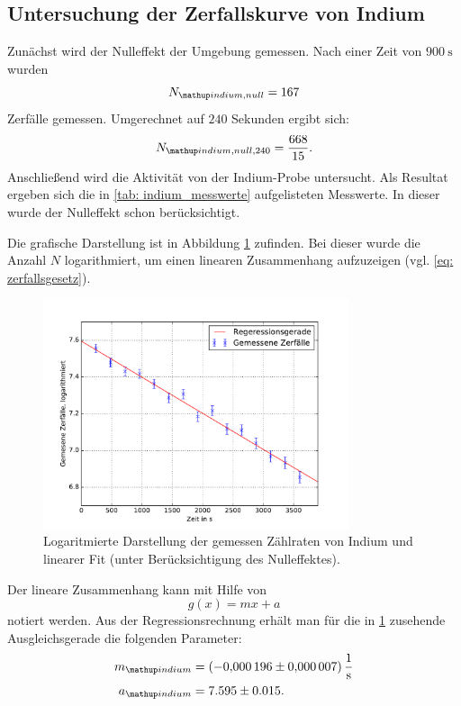 \subsection{Untersuchung der Zerfallskurve von Indium}
Zunächst wird der Nulleffekt der Umgebung gemessen.
Nach einer Zeit von $\SI{900}{\second}$ wurden
\begin{equation*}
  N\ua{indium,null}=167
\end{equation*}
Zerfälle gemessen. Umgerechnet auf $240$ Sekunden ergibt sich:
\begin{equation}
  \label{eq:nulleffekt_indium}
   N\ua{indium,null,240}=\frac{668}{15}.
\end{equation}
Anschließend wird die Aktivität von der Indium-Probe untersucht. %
Als Resultat ergeben sich die in \ref{tab: indium_messwerte} aufgelisteten Messwerte. %
In dieser wurde der Nulleffekt schon berücksichtigt.

Die grafische Darstellung ist in Abbildung \ref{fig: plot_indium} zufinden. Bei dieser wurde%
die Anzahl $N$ logarithmiert, um einen linearen Zusammenhang aufzuzeigen (vgl. \eqref{eq: zerfallsgesetz}).
\begin{figure}
  \centering
  \includegraphics[width=0.8\textwidth]{pics/logarithmiert_indium.pdf}
  \caption{Logaritmierte Darstellung der gemessen Zählraten von Indium und linearer Fit  (unter Berücksichtigung des Nulleffektes).} %
  \label{fig: plot_indium}
\end{figure}
Der lineare Zusammenhang kann mit Hilfe von
\begin{equation*}
  g(x)=mx+a
\end{equation*}
notiert werden.
Aus der Regressionsrechnung erhält man für die in \ref{fig: plot_indium} zusehende %
Ausgleichsgerade die folgenden Parameter:
\begin{align}
  \label{eq:parameter_indium}
  \begin{aligned}
    m\ua{indium}&=\SI{-0.000196\pm0.000007}{\per\second}\\
    a\ua{indium}&=7.595\pm0.015.
  \end{aligned}
\end{align}

